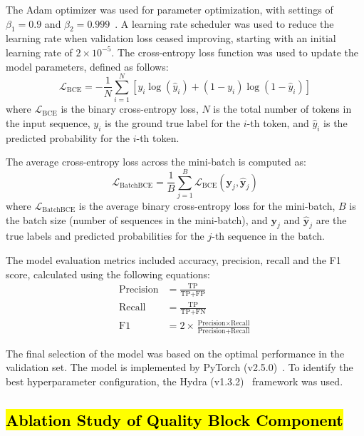 \documentclass[pdflatex,sn-nature, lineno]{sn-jnl}%
\begin{document}
The Adam optimizer was used for parameter optimization, with settings of \(\beta_{1} = 0.9 \) and \(\beta_{2} = 0.999 \)~\cite{kingma2014adam}.
A learning rate scheduler was used to reduce the learning rate when validation loss ceased improving, starting with an initial learning rate of \(2 \times 10^{-5} \).
The cross-entropy loss function was used to update the model parameters, defined as follows:
\[
	\mathcal{L}_{\textrm{BCE}} = -\frac{1}{N} \sum_{i=1}^{N} [y_i \log(\hat{y}_i) + (1 - y_i) \log(1 - \hat{y}_i)]
\]
where \(\mathcal{L}_{\textrm{BCE}}\) is the binary cross-entropy loss, \(N\) is the total number of tokens in the input sequence, \(y_i\) is the ground true label for the \(i\)-th token, and \(\hat{y}_i\) is the predicted probability for the \(i\)-th token.

The average cross-entropy loss across the mini-batch is computed as:
\[
	\mathcal{L}_{\textrm{BatchBCE}} = \frac{1}{B} \sum_{j=1}^{B} \mathcal{L}_{\textrm{BCE}}(\mathbf{y}_j, \hat{\mathbf{y}}_j)
\]
where \(\mathcal{L}_{\textrm{BatchBCE}}\) is the average binary cross-entropy loss for the mini-batch, \(B\) is the batch size (number of sequences in the mini-batch),  and \(\mathbf{y}_j\) and \(\hat{\mathbf{y}}_j\) are the true labels and predicted probabilities for the \(j\)-th sequence in the batch.

The model evaluation metrics included accuracy, precision, recall and the F1 score, calculated using the following equations:
\begin{align*}
	\textrm{Precision} & = \frac{\textrm{TP}}{\textrm{TP}+\textrm{FP}}                                                     \\
	\textrm{Recall}    & = \frac{\textrm{TP}}{\textrm{TP}+\textrm{FN}}                                                     \\
	\textrm{F1}        & = 2 \times \frac{\textrm{Precision} \times \textrm{Recall}}{\textrm{Precision} + \textrm{Recall}}
\end{align*}

The final selection of the model was based on the optimal performance in the validation set.
The model is implemented by PyTorch (v2.5.0)~\cite{paszke2019pytorch}.
To identify the best hyperparameter configuration, the Hydra (v1.3.2)~\cite{Yadan2019Hydra} framework was used.

\subsection{\hl{Ablation Study of Quality Block Component}}
\end{document}
